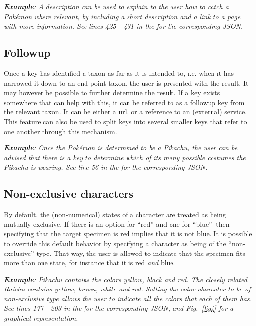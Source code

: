 \documentclass[10pt,letterpaper]{article}
\begin{document}
\textit{\textbf{Example}: A description can be used to explain to the user how to catch a Pokémon where relevant, by including a short description and a link to a page with more information. See lines 425 - 431 in the  for the corresponding JSON.}
\subsection*{
Followup
}
Once a key has identified a taxon as far as it is intended to, i.e. when it has narrowed it down to an end point taxon, the user is presented with the result. It may however be possible to further determine the result. If a key exists somewhere that can help with this, it can be referred to as a followup key from the relevant taxon. It can be either a url, or a reference to an (external) service. This feature can also be used to split keys into several smaller keys that refer to one another through this mechanism.

\textit{\textbf{Example}: Once the Pokémon is determined to be a Pikachu, the user can be advised that there is a key to determine which of its many possible costumes the Pikachu is wearing. See line 56 in the  for the corresponding JSON.}
\subsection*{
Non-exclusive characters
}
By default, the (non-numerical) states of a character are treated as being mutually exclusive. If there is an option for ``red'' and one for ``blue'', then specifying that the target specimen is red implies that it is not blue. It is possible to override this default behavior by specifying a character as being of the ``non-exclusive'' type. That way, the user is allowed to indicate that the specimen fits more than one state, for instance that it is red \textit{and} blue.

\textit{\textbf{Example}: Pikachu contains the colors yellow, black and red. The closely related Raichu contains yellow, brown, white and red. Setting the color character to be of non-exclusive type allows the user to indicate all the colors that each of them has. See lines 177 - 203 in the  for the corresponding JSON, and Fig.~\ref{fig4} for a graphical representation.}
\end{document}

